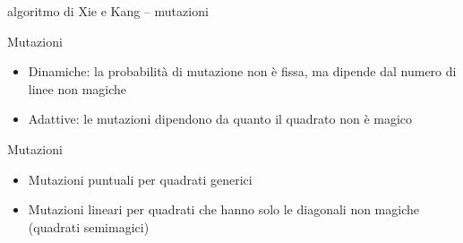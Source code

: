 \documentclass[10pt]{beamer}
\begin{document}
\begin{frame}{algoritmo di Xie e Kang -- mutazioni}



    \begin{block}{Mutazioni}
      \parbox{0.98\columnwidth}{
        \begin{itemize}
        \item Dinamiche: la probabilità di mutazione non è fissa, ma dipende dal numero di linee non magiche
        \item Adattive: le mutazioni dipendono da quanto il quadrato non è magico
        \end{itemize}
      }
    \end{block}
    
    \begin{block}{Mutazioni}
    	\parbox{0.98\columnwidth}{
    		\begin{itemize}
    			\item \alert{Mutazioni puntuali} per quadrati generici
    			\item \alert{Mutazioni lineari} per quadrati che hanno solo le diagonali non magiche (\alert{quadrati semimagici})
    		\end{itemize}
    	}
    \end{block}   
     

\end{frame}
\end{document}
